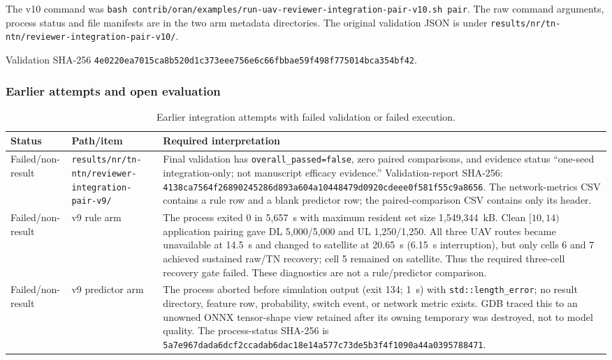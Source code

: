 {\footnotesize\raggedright
\noindent The v10 command was \texttt{bash contrib/\allowbreak oran/\allowbreak examples/\allowbreak run-\allowbreak uav-\allowbreak reviewer-\allowbreak integration-\allowbreak pair-\allowbreak v10.sh pair}. The raw command arguments, process status and file manifests are in the two arm metadata directories. The original validation JSON is under \texttt{results/\allowbreak nr/\allowbreak tn-\allowbreak ntn/\allowbreak reviewer-\allowbreak integration-\allowbreak pair-\allowbreak v10/}.
\par\noindent Validation SHA-256 \texttt{4e0220ea7015ca8b\allowbreak 520d1c373eee756e\allowbreak 6c66fbbae59f498f\allowbreak 775014bca354bf42}.\par}
\subsubsection*{Earlier attempts and open evaluation}

\begin{table}[t]
\centering
\footnotesize
\caption{Earlier integration attempts with failed validation or failed execution.}
\label{tab:audited_earlier_attempts}
\begin{tabular}{p{} p{} p{}}
\hline
Status & Path/item & Required interpretation \\
\hline
Failed/non-result & \texttt{results/\allowbreak nr/\allowbreak tn-\allowbreak ntn/\allowbreak reviewer-\allowbreak integration-\allowbreak pair-\allowbreak v9/\allowbreak } & Final validation has \texttt{overall\_\allowbreak passed=false}, zero paired comparisons, and evidence status ``one-seed integration-only; not manuscript efficacy evidence.''  Validation-report SHA-256: \texttt{4138ca7564f26890\allowbreak 245286d893a604a1\allowbreak 0448479d0920cdee\allowbreak e0f581f55c9a8656}.  The network-metrics CSV contains a rule row and a blank predictor row; the paired-comparison CSV contains only its header. \\
Failed/non-result & v9 rule arm & The process exited 0 in 5,657~s with maximum resident set size 1,549,344~kB.  Clean $[10,14)$ application pairing gave DL 5,000/5,000 and UL 1,250/1,250.  All three UAV routes became unavailable at 14.5~s and changed to satellite at 20.65~s (6.15~s interruption), but only cells 6 and 7 achieved sustained raw/TN recovery; cell 5 remained on satellite.  Thus the required three-cell recovery gate failed.  These diagnostics are not a rule/predictor comparison. \\
Failed/non-result & v9 predictor arm & The process aborted before simulation output (exit 134; 1~s) with \texttt{std::length\_\allowbreak error}; no result directory, feature row, probability, switch event, or network metric exists.  GDB traced this to an unowned ONNX tensor-shape view retained after its owning temporary was destroyed, not to model quality.  The process-status SHA-256 is \texttt{5a7e967dada6dcf2\allowbreak ccadab6dac18e14a\allowbreak 577c73de5b3f4f10\allowbreak 90a44a0395788471}. \\
\hline
\end{tabular}
\end{table}

